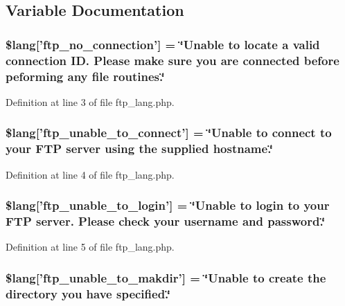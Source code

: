 \subsection{Variable Documentation}
\subsubsection[{\$lang}]{\setlength{\rightskip}{0pt plus 5cm}\$lang['ftp\-\_\-no\-\_\-connection'] = \char`\"{}Unable {\bf to} locate {\bf a} valid connection I\-D. Please make sure you are connected before peforming any file routines.\char`\"{}}\label{ftp__lang_8php_a8630404f8e0c3750f8d997f35622b6eb}


Definition at line 3 of file ftp\-\_\-lang.\-php.

\subsubsection[{\$lang}]{\setlength{\rightskip}{0pt plus 5cm}\$lang['ftp\-\_\-unable\-\_\-to\-\_\-connect'] = \char`\"{}Unable {\bf to} connect {\bf to} your F\-T\-P server using the supplied hostname.\char`\"{}}\label{ftp__lang_8php_a57d51cf019dd2e380b84c6e31cda0cf5}


Definition at line 4 of file ftp\-\_\-lang.\-php.

\subsubsection[{\$lang}]{\setlength{\rightskip}{0pt plus 5cm}\$lang['ftp\-\_\-unable\-\_\-to\-\_\-login'] = \char`\"{}Unable {\bf to} login {\bf to} your F\-T\-P server. Please check your username {\bf and} password.\char`\"{}}\label{ftp__lang_8php_affe13cbf898e1802abb3cd9d9ce2db97}


Definition at line 5 of file ftp\-\_\-lang.\-php.

\subsubsection[{\$lang}]{\setlength{\rightskip}{0pt plus 5cm}\$lang['ftp\-\_\-unable\-\_\-to\-\_\-makdir'] = \char`\"{}Unable {\bf to} create the directory you have specified.\char`\"{}}\label{ftp__lang_8php_a8669265afd6d483a551808d784edbd3f}


